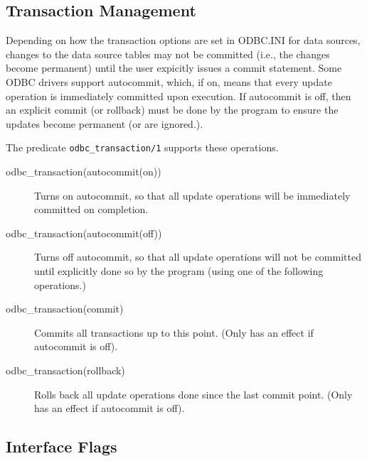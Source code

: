 \subsection{Transaction Management}\label{TransactionManagement}

Depending on how the transaction options are set in ODBC.INI for data
sources, changes to the data source tables may not be
committed (i.e., the changes become permanent) until the user expicitly
issues a commit statement.  Some ODBC drivers support autocommit,
which, if on, means that every update operation is immediately
committed upon execution.  If autocommit is off, then an explicit
commit (or rollback) must be done by the program to ensure the updates 
become permanent (or are ignored.).

The predicate {\tt odbc\_transaction/1} supports these operations.

\begin{description}
\item[odbc\_transaction(autocommit(on))]
        Turns on autocommit, so that all update operations will be
        immediately committed on completion.
\item[odbc\_transaction(autocommit(off))]
        Turns off autocommit, so that all update operations will not
        be committed until explicitly done so by the program (using
        one of the following operations.)
\item[odbc\_transaction(commit)]
        Commits all transactions up to this point.  (Only has an
        effect if autocommit is off).
\item[odbc\_transaction(rollback)]
        Rolls back all update operations done since the last commit
        point.  (Only has an effect if autocommit is off).
\end{description}


\subsection{Interface Flags}

